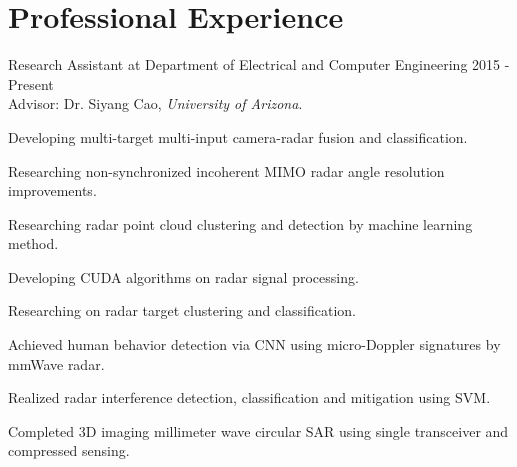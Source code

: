 \documentclass[letterpaper,9pt]{article}
\renewenvironment{itemize}{
  \begin{list}{}{
    \setlength{\topsep}{0pt}
    \setlength{\itemsep}{0pt}
    \setlength{\parsep}{0pt}
    \setlength{\partopsep}{0pt}
    \setlength{\leftmargin}{1.5em}
  }
}{\end{list}}
\begin{document}
\section*{Professional Experience}
\begin{itemize}
  \setlength{\itemsep}{1em}
  \item Research Assistant at Department of Electrical and Computer Engineering \hfill 2015 - Present\\
Advisor: Dr. Siyang Cao, {\it University of Arizona}.
  \begin{itemize}
    \item [$\bullet$] Developing multi-target multi-input camera-radar fusion and classification.
    \item [$\bullet$] Researching non-synchronized incoherent MIMO radar angle resolution improvements.
    \item [$\bullet$] Researching radar point cloud clustering and detection by machine learning method.
    \item [$\bullet$] Developing CUDA algorithms on radar signal processing.
    \item [$\bullet$] Researching on radar target clustering and classification.
    \item [$\bullet$] Achieved human behavior detection via CNN using micro-Doppler signatures by mmWave radar.
    \item [$\bullet$] Realized radar interference detection, classification and mitigation using SVM.

    \item [$\bullet$] Completed 3D imaging millimeter wave circular SAR using single transceiver and compressed sensing.
  \end{itemize}


\end{itemize}
\end{document}
